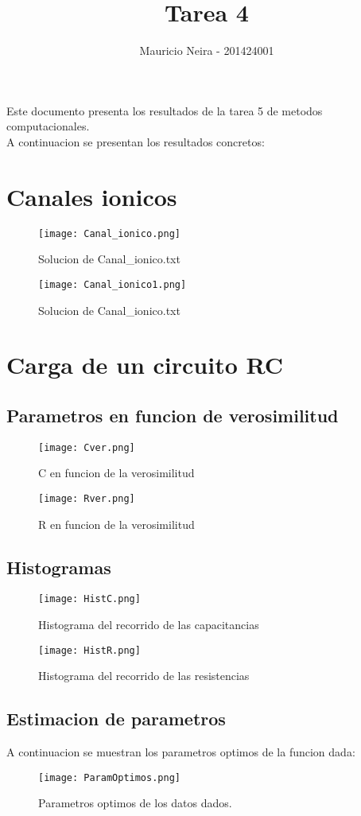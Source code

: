 \documentclass{article}
\begin{document}
\title{Tarea 4}
\author{Mauricio Neira - 201424001}

\maketitle

Este documento presenta los resultados de la tarea 5 de metodos computacionales. \\

A continuacion se presentan los resultados concretos:

\section{Canales ionicos}

\begin{figure}[H]
\texttt{[image: Canal\_ionico.png]}
\caption{Solucion de Canal\_ionico.txt}
\end{figure}

\begin{figure}[H]
\texttt{[image: Canal\_ionico1.png]}
\caption{Solucion de Canal\_ionico.txt}
\end{figure}

\section{Carga de un circuito RC}
\subsection{Parametros en funcion de verosimilitud}
\begin{figure}[H]
\texttt{[image: Cver.png]}
\caption{C en funcion de la verosimilitud}
\end{figure}

\begin{figure}[H]
\texttt{[image: Rver.png]}
\caption{R en funcion de la verosimilitud}
\end{figure}
\subsection{Histogramas}

\begin{figure}[H]
\texttt{[image: HistC.png]}
\caption{Histograma del recorrido de las capacitancias}
\end{figure}

\begin{figure}[H]
\texttt{[image: HistR.png]}
\caption{Histograma del recorrido de las resistencias}
\end{figure}

\subsection{Estimacion de parametros}
A continuacion se muestran los parametros optimos de la funcion dada:

\begin{figure}[H]
\texttt{[image: ParamOptimos.png]}
\caption{Parametros optimos de los datos dados.}
\end{figure}
\end{document}
